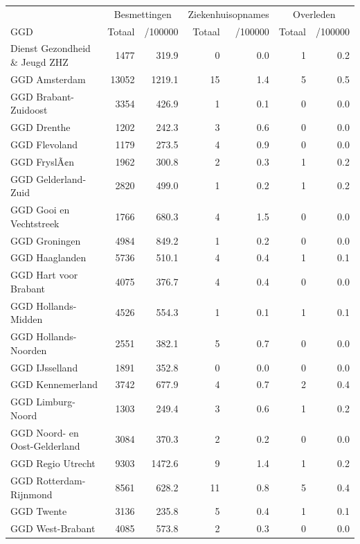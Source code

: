 \documentclass[
  english,
  man,floatsintext]{apa6}
\begin{document}
\begin{table}
\centering\begingroup\fontsize{10}{12}\selectfont

\begin{threeparttable}
\begin{tabular}{lrrrrrr}
\toprule
\multicolumn{1}{c}{ } & \multicolumn{2}{c}{Besmettingen} & \multicolumn{2}{c}{Ziekenhuisopnames} & \multicolumn{2}{c}{Overleden} \\
\cmidrule(l{3pt}r{3pt}){2-3} \cmidrule(l{3pt}r{3pt}){4-5} \cmidrule(l{3pt}r{3pt}){6-7}
GGD & Totaal & /100000 & Totaal & /100000 & Totaal & /100000\\
\midrule
Dienst Gezondheid \& Jeugd ZHZ & 1477 & 319.9 & 0 & 0.0 & 1 & 0.2\\
GGD Amsterdam & 13052 & 1219.1 & 15 & 1.4 & 5 & 0.5\\
GGD Brabant-Zuidoost & 3354 & 426.9 & 1 & 0.1 & 0 & 0.0\\
GGD Drenthe & 1202 & 242.3 & 3 & 0.6 & 0 & 0.0\\
GGD Flevoland & 1179 & 273.5 & 4 & 0.9 & 0 & 0.0\\
GGD FryslÃ¢n & 1962 & 300.8 & 2 & 0.3 & 1 & 0.2\\
GGD Gelderland-Zuid & 2820 & 499.0 & 1 & 0.2 & 1 & 0.2\\
GGD Gooi en Vechtstreek & 1766 & 680.3 & 4 & 1.5 & 0 & 0.0\\
GGD Groningen & 4984 & 849.2 & 1 & 0.2 & 0 & 0.0\\
GGD Haaglanden & 5736 & 510.1 & 4 & 0.4 & 1 & 0.1\\
GGD Hart voor Brabant & 4075 & 376.7 & 4 & 0.4 & 0 & 0.0\\
GGD Hollands-Midden & 4526 & 554.3 & 1 & 0.1 & 1 & 0.1\\
GGD Hollands-Noorden & 2551 & 382.1 & 5 & 0.7 & 0 & 0.0\\
GGD IJsselland & 1891 & 352.8 & 0 & 0.0 & 0 & 0.0\\
GGD Kennemerland & 3742 & 677.9 & 4 & 0.7 & 2 & 0.4\\
GGD Limburg-Noord & 1303 & 249.4 & 3 & 0.6 & 1 & 0.2\\
GGD Noord- en Oost-Gelderland & 3084 & 370.3 & 2 & 0.2 & 0 & 0.0\\
GGD Regio Utrecht & 9303 & 1472.6 & 9 & 1.4 & 1 & 0.2\\
GGD Rotterdam-Rijnmond & 8561 & 628.2 & 11 & 0.8 & 5 & 0.4\\
GGD Twente & 3136 & 235.8 & 5 & 0.4 & 1 & 0.1\\
GGD West-Brabant & 4085 & 573.8 & 2 & 0.3 & 0 & 0.0\\

\end{tabular}
\end{threeparttable}
\end{table}
\end{document}
